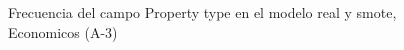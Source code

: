 \begin{figure}[H]
    \centering
    
    \caption{Frecuencia del campo Property type en el modelo real y smote, Economicos (A-3)}
    \label{frecuency-Property Type-smote-enc}
\end{figure}